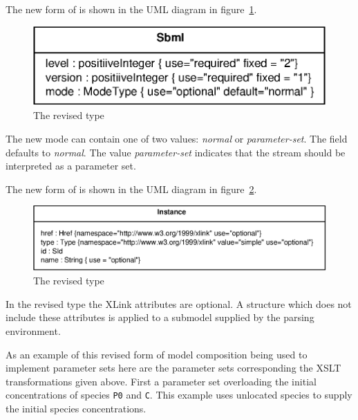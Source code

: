 \documentclass[10pt,twocolumntoc]{cekarticle}
\begin{document}
The new form of  is shown in the UML diagram in figure~\ref{fig:sbml}.

\begin{figure}[h]
  \vspace*{8pt}
  \centering
  \includegraphics[scale = 0.7]{sbml}
  \caption{The revised  type}
  \label{fig:sbml}
\end{figure}

The new mode  can contain one of two values: \emph{normal} or \emph{parameter-set}.
The field defaults to \emph{normal}.  The value \emph{parameter-set} indicates that the stream
should be interpreted as a parameter set.

The new form of  is shown in the UML diagram in figure~\ref{fig:instance}.

\begin{figure}[h]
  \vspace*{8pt}
  \centering
  \includegraphics[scale = 0.7]{instance}
  \caption{The revised  type}
  \label{fig:instance}
\end{figure}

In the revised type the XLink attributes are optional.  A  structure which does not
include these attributes is applied to a submodel supplied by the parsing environment.

As an example of this revised form of model composition being used to implement parameter sets
here are the parameter sets corresponding the XSLT transformations given above.
First a parameter set overloading the initial concentrations of species \texttt{P0} and \texttt{C}.
This example uses unlocated species to supply the initial species concentrations.
\end{document}
